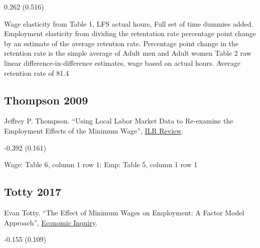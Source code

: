 \vspace{0.7em}

 0.262 (0.516)

\vspace{0.7em}

 Wage elasticity from Table 1, LFS actual hours, Full set of time dummies added. Employment elasticity from dividing the retentation rate percentage point change by an estimate of the average retention rate. Percentage point change in the retention rate is the simple average of Adult men and Adult women Table 2 raw linear difference-in-difference estimates, wage based on actual hours. Average retention rate of 81.4%

\subsection*{Thompson 2009}
\vspace{-0.7em}

\noindent Jeffrey P. Thompson. ``Using Local Labor Market Data to Re-examine the Employment Effects of the Minimum Wage'', \href{https://doi.org/10.1177/001979390906200305}{ILR Review}.

\vspace{0.7em}

 -0.392 (0.161)

\vspace{0.7em}

 Wage: Table 6, column 1 row 1; Emp: Table 5, column 1 row 1

\subsection*{Totty 2017}
\vspace{-0.7em}

\noindent Evan Totty. ``The Effect of Minimum Wages on Employment: A Factor Model Approach'', \href{https://doi.org/10.1111/ecin.12472}{Economic Inquiry}.

\vspace{0.7em}

 -0.155 (0.109)

\vspace{0.7em}


